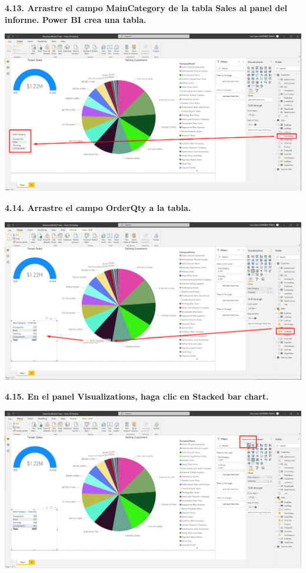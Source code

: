 \documentclass{article}
\begin{document}
\textbf{4.13. Arrastre el campo \textbf{MainCategory} de la tabla \textbf{Sales} al panel del informe. Power BI crea una tabla.}

    \begin{center}
		\includegraphics[width=14cm]{./images/89} 
	\end{center}

\newpage
\textbf{4.14. Arrastre el campo \textbf{OrderQty} a la tabla.}

    \begin{center}
		\includegraphics[width=14cm]{./images/90} 
	\end{center}


\textbf{4.15. En el panel \textbf{Visualizations}, haga clic en \textbf{Stacked bar chart}.}

    \begin{center}
		\includegraphics[width=14cm]{./images/91} 
	\end{center}
\end{document}
